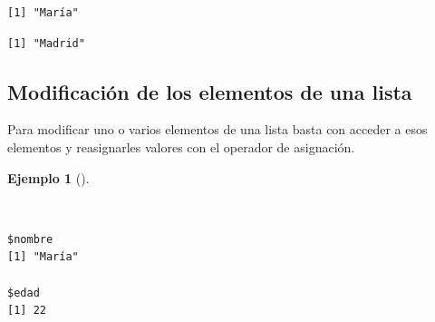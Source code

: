\documentclass[
  a4paper,
]{scrreport}
\newenvironment{Shaded}{\begin{snugshade}}{\end{snugshade}}
\newcommand{\CommentTok}[1]{\textcolor[rgb]{0.37,0.37,0.37}{#1}}
\newcommand{\DecValTok}[1]{\textcolor[rgb]{0.68,0.00,0.00}{#1}}
\newcommand{\FunctionTok}[1]{\textcolor[rgb]{0.28,0.35,0.67}{#1}}
\newcommand{\NormalTok}[1]{\textcolor[rgb]{0.00,0.23,0.31}{#1}}
\newcommand{\OtherTok}[1]{\textcolor[rgb]{0.00,0.23,0.31}{#1}}
\newcommand{\SpecialCharTok}[1]{\textcolor[rgb]{0.37,0.37,0.37}{#1}}
\newcommand{\StringTok}[1]{\textcolor[rgb]{0.13,0.47,0.30}{#1}}
\theoremstyle{definition}
\theoremstyle{definition}
\newtheorem{example}{Ejemplo}[chapter]
\theoremstyle{remark}
\begin{document}
\begin{Shaded}
\end{Shaded}

\begin{verbatim}
[1] "María"
\end{verbatim}

\begin{Shaded}
\end{Shaded}

\begin{verbatim}
[1] "Madrid"
\end{verbatim}

\subsection{Modificación de los elementos de una
lista}\label{modificaciuxf3n-de-los-elementos-de-una-lista}

Para modificar uno o varios elementos de una lista basta con acceder a
esos elementos y reasignarles valores con el operador de asignación.

\begin{example}[]\protect\hypertarget{exm-modificacion-listas}{}\label{exm-modificacion-listas}

~

\begin{Shaded}
\end{Shaded}

\begin{verbatim}
$nombre
[1] "María"

$edad
[1] 22
\end{verbatim}

\end{example}
\end{document}
